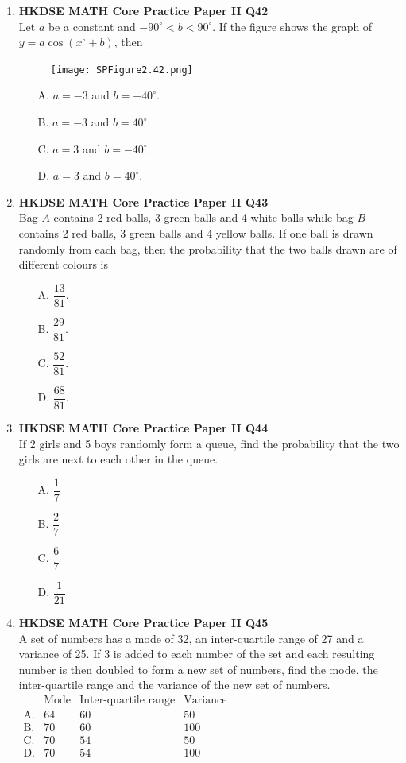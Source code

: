 \documentclass[12pt]{article}
\begin{document}
\begin{enumerate}
	\item \textbf{HKDSE MATH Core Practice Paper II Q42}\\
	Let $a$ be a constant and $-90^\circ < b < 90^\circ$. If the figure shows the graph of $y = a\cos{(x^\circ + b)}$, then 
	\begin{figure}[H]
		\centering
		\texttt{[image: SPFigure2.42.png]}	
	\end{figure}
	\begin{enumerate}
		\item[A.] $a = -3$ and $b = -40^\circ$.
		\item[B.] $a = -3$ and $b = 40^\circ$.
		\item[C.] $a = 3$ and $b = -40^\circ$.
		\item[D.] $a = 3$ and $b = 40^\circ$.
	\end{enumerate}
	
	\item \textbf{HKDSE MATH Core Practice Paper II Q43}\\
	Bag $A$ contains 2 red balls, 3 green balls and 4 white balls while bag $B$ contains 2 red balls, 3 green balls and 4 yellow balls. If one ball is drawn randomly from each bag, then the probability that the two balls drawn are of different colours is
	\begin{enumerate}
		\item[A.] $\dfrac{13}{81}$.
		\item[B.] $\dfrac{29}{81}$.
		\item[C.] $\dfrac{52}{81}$.
		\item[D.] $\dfrac{68}{81}$.
	\end{enumerate}
	
	\item \textbf{HKDSE MATH Core Practice Paper II Q44}\\
	If 2 girls and 5 boys randomly form a queue, find the probability that the two girls are next to each other in the queue.
	\begin{enumerate}
		\item[A.] $\dfrac{1}{7}$
		\item[B.] $\dfrac{2}{7}$
		\item[C.] $\dfrac{6}{7}$
		\item[D.] $\dfrac{1}{21}$
	\end{enumerate}
	
	\item \textbf{HKDSE MATH Core Practice Paper II Q45}\\
	A set of numbers has a mode of 32, an inter-quartile range of 27 and a variance of 25. If 3 is added to each number of the set and each resulting number is then doubled to form a new set of numbers, find the mode, the inter-quartile range and the variance of the new set of numbers.
	$\begin{matrix}
	&\text{Mode}&\text{Inter-quartile range}&\text{Variance}\\
	\text{A.}&64&60&50\\
	\text{B.}&70&60&100\\
	\text{C.}&70&54&50\\
	\text{D.}&70&54&100\\
	\end{matrix}$

\end{enumerate}
\end{document}
